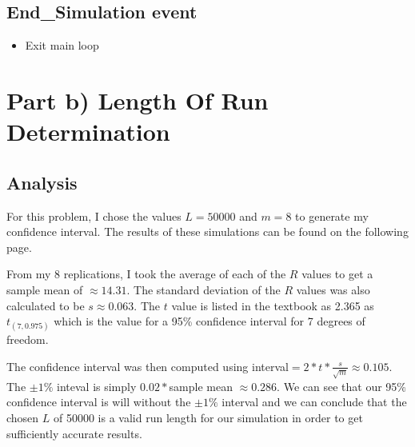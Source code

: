 \documentclass[12pt]{article}
\begin{document}
\subsection{End\_Simulation event}
\begin{itemize}
\setlength{\itemsep}{-3mm}
\item Exit main loop
\end{itemize}

\section{Part b) Length Of Run Determination}
\subsection{Analysis}
For this problem, I chose the values $L = 50000$ and $m = 8$ to generate my
confidence interval.  The results of these simulations can be found on the
following page.

From my 8 replications, I took the average of each of the $R$ values to get a
sample mean of $\approx 14.31$.  The standard deviation of the $R$ values was
also calculated to be $s \approx 0.063$.  The $t$ value is listed in the
textbook as 2.365 as $t_{(7, 0.975)}$ which is the value for a 95\% confidence
interval for 7 degrees of freedom.

The confidence interval was then computed using interval$ = 2 * t *
\frac{s}{\sqrt{m}} \approx 0.105$.  The $\pm 1\%$ inteval is simply $0.02 *
$sample mean $ \approx 0.286$.  We can see that our 95\% confidence interval is
will without the $\pm 1\%$ interval and we can conclude that the chosen $L$ of
50000 is a valid run length for our simulation in order to get sufficiently
accurate results.
\end{document}
